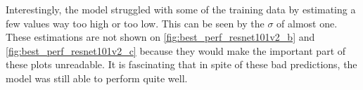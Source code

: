 Interestingly, the model struggled with some of the training data by estimating a few values way too high or too low. This can be seen by the $\sigma$ of almost one. These estimations are not shown on \autoref{fig:best_perf_resnet101v2_b} and \autoref{fig:best_perf_resnet101v2_c} because they would make the important part of these plots unreadable. It is fascinating that in spite of these bad predictions, the model was still able to perform quite well.